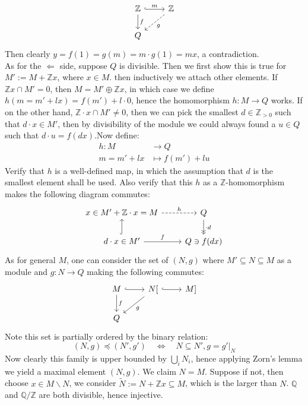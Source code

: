 \documentclass[12pt]{article}
\theoremstyle{definition}
\theoremstyle{plain}
\newcommand{\rat}{\mathbb{Q}}
\newcommand{\z}{\mathbb{Z}}
\renewcommand{\tilde}{\widetilde}
\begin{document}
\begin{equation}
  \begin{tikzcd}
    \z\ar[hook]{r}{m}\ar{d}{f}&\z\ar[dashed]{ld}{g}\\
    Q
  \end{tikzcd}
\end{equation}
Then clearly $y=f(1)=g(m)=m\cdot g(1)=mx$, a contradiction.\\
As for the $\Leftarrow$ side, suppose $Q$ is divisible. Then we first show this is true for $M':=M+\z x$, where $x\in M$. then inductively we attach other elements. If $\z x\cap M'=0$, then $M=M'\oplus \z x$, in which case we define $h(m=m'+lx)=f(m')+l\cdot 0$, hence the homomorphism $h:M\to Q$ works. If on the other hand,  $\z \cdot x\cap M'\neq 0$, then we can pick the smallest $d\in \z_{>0} $ such that $d\cdot x\in M'$, then by divisibility of the module we could always found a $u\in Q$ such that $d\cdot u=f(dx)$.Now define:
\begin{align*}
  h:M&\to Q\\
  m=m'+lx&\mapsto f(m')+lu
\end{align*}
Verify that $h$ is a well-defined map, in which the assumption that $d$ is the smallest element shall be used. Also verify that this $h$ as a $\z$-homomorphism makes the following diagram commutes:
\begin{equation}
  \begin{tikzcd}
    x\in M'+\z\cdot x=M\ar[dashed]{r}{h} &Q\ar[->>]{d}{\cdot d}\\
    d\cdot x\in M'\ar[hook]{u}\ar{r}{f} &Q\ni f(dx)
  \end{tikzcd}
\end{equation}
As for general $M$, one can consider the set of $(N, g)$ where $M'\subseteq N\subseteq M$ as a module and $g:N\to Q$ making the following commutes:
\begin{equation}
  \begin{tikzcd}
    M\ar[hook]{r}\ar{d}{f} &N[\ar{ld}{g}\ar[hook]{r}&M]\\
    Q
  \end{tikzcd}
\end{equation}
Note this set is partially ordered by the binary relation:
$$(N, g)\preceq (N', g')\quad \iff \quad N\subseteq N', g=g'|_N$$
Now clearly this family is upper bounded by $\bigcup_i N_i$, hence applying Zorn's lemma we yield a maximal element $(N, g)$. We claim $N=M$. Suppose if not, then choose $x\in M\backslash N$, we consider $\tilde{N}:=N+\z x\subseteq M$, which is the larger than $N$.
\Exe $\rat$ and $\rat/\z$ are both divisible, hence injective.
\end{document}
